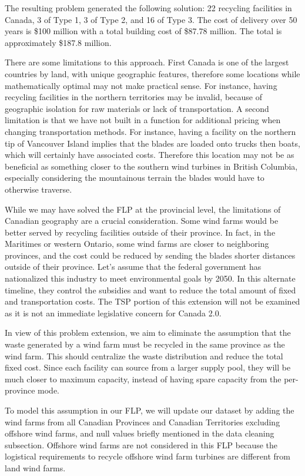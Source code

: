 The resulting problem generated the following solution: 22 recycling facilities in Canada, 3 of Type 1, 3 of Type 2, and  16 of Type 3. The cost of delivery over 50 years is \$100 million with a total building cost of \$87.78 million. The total is approximately \$187.8 million.  

There are some limitations to this approach. First Canada is one of the largest countries by land, with unique geographic features, therefore some locations while mathematically optimal may not make practical sense. For instance, having recycling facilities in the northern territories may be invalid, because of geographic isolation for raw materials or lack of transportation. A second limitation is that we have not built in a function for additional pricing when changing transportation methods.  For instance, having a facility on the northern tip of Vancouver Island implies that the blades are loaded onto trucks then boats, which will certainly have associated costs. Therefore this location may not be as beneficial as something closer to the southern wind turbines in British Columbia, especially considering the mountainous terrain the blades would have to otherwise traverse.


While we may have solved the FLP at the provincial level, the limitations of Canadian geography are a crucial consideration. Some wind farms would be better served by recycling facilities outside of their province. In fact, in the Maritimes or western Ontario, some wind farms are closer to neighboring provinces, and the cost could be reduced by sending the blades shorter distances outside of their province. Let’s assume that the federal government has nationalized this industry to meet environmental goals by 2050. In this alternate timeline, they control the subsidies and want to reduce the total amount of fixed and transportation costs. The TSP portion of this extension will not be examined as it is not an immediate legislative concern for Canada 2.0. 

In view of this problem extension, we aim to eliminate the assumption that the waste generated by a wind farm must be recycled in the same province as the wind farm. This should centralize the waste distribution and reduce the total fixed cost. Since each facility can source from a larger supply pool, they will be much closer to maximum capacity, instead of having spare capacity from the per-province mode.  

To model this assumption in our FLP, we will update our dataset by adding the wind farms from all Canadian Provinces and Canadian Territories excluding offshore wind farms, and null values briefly mentioned in the data cleaning subsection. Offshore wind farms are not considered in this FLP because the logistical requirements to recycle offshore wind farm turbines are different from land wind farms.  

